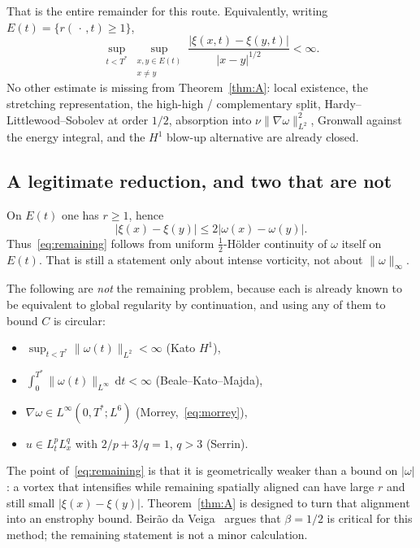 \documentclass[11pt,a4paper]{article}
\theoremstyle{definition}
\theoremstyle{remark}
\newcommand{\abs}[1]{\lvert#1\rvert}
\newcommand{\norm}[1]{\lVert#1\rVert}
\newcommand{\dd}{\mathrm{d}}
\begin{document}
That is the entire remainder for this route. Equivalently, writing
\(E(t)=\{r(\,\cdot\,,t)\ge 1\}\),
\begin{equation}
\label{eq:remaining-pairs}
\sup_{t<T^*}
\sup_{\substack{x,y\in E(t)\\ x\neq y}}
\frac{\abs{\xi(x,t)-\xi(y,t)}}{\abs{x-y}^{1/2}}
<\infty.
\end{equation}
No other estimate is missing from Theorem~\ref{thm:A}: local existence,
the stretching representation, the high-high / complementary split,
Hardy--Littlewood--Sobolev at order \(1/2\), absorption into
\(\nu\norm{\nabla\omega}_{L^2}^2\), Gronwall against the energy integral,
and the \(H^1\) blow-up alternative are already closed.

\subsection{A legitimate reduction, and two that are not}

On \(E(t)\) one has \(r\ge 1\), hence
\begin{equation}
\label{eq:xi-by-omega}
\abs{\xi(x)-\xi(y)}
\le 2\abs{\omega(x)-\omega(y)}.
\end{equation}
Thus~\eqref{eq:remaining} follows from uniform \(\tfrac12\)-H\"older
continuity of \(\omega\) itself on \(E(t)\). That is still a statement
only about intense vorticity, not about \(\norm{\omega}_\infty\).

The following are \emph{not} the remaining problem, because each is
already known to be equivalent to global regularity by continuation, and
using any of them to bound \(C\) is circular:
\begin{itemize}
\item \(\sup_{t<T^*}\norm{\omega(t)}_{L^2}<\infty\) (Kato \(H^1\)),
\item \(\int_0^{T^*}\norm{\omega(t)}_{L^\infty}\,\dd t<\infty\)
(Beale--Kato--Majda),
\item \(\nabla\omega\in L^\infty(0,T^*;L^6)\) (Morrey,~\eqref{eq:morrey}),
\item \(u\in L^p_t L^q_x\) with \(2/p+3/q=1\), \(q>3\) (Serrin).
\end{itemize}
The point of~\eqref{eq:remaining} is that it is geometrically weaker than
a bound on \(\abs{\omega}\): a vortex that intensifies while remaining
spatially aligned can have large \(r\) and still small
\(\abs{\xi(x)-\xi(y)}\). Theorem~\ref{thm:A} is designed to turn that
alignment into an enstrophy bound. Beir\~ao da Veiga~\cite{BdV2016}
argues that \(\beta=1/2\) is critical for this method; the remaining
statement is not a minor calculation.
\end{document}
